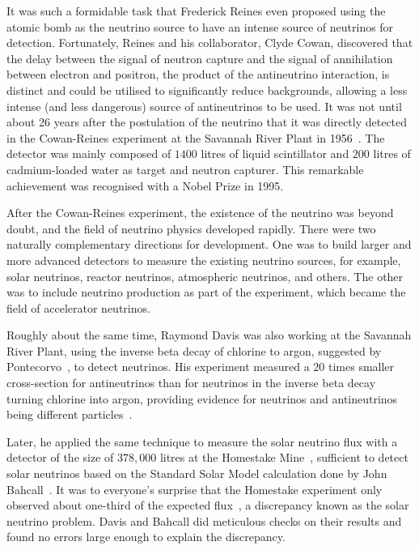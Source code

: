 It was such a formidable task that Frederick Reines even proposed using the atomic bomb as the neutrino source to have an intense source of neutrinos for detection.
Fortunately, Reines and his collaborator, Clyde Cowan, discovered that the delay between the signal of neutron capture and the signal of annihilation between electron and positron, the product of the antineutrino interaction, is distinct and could be utilised to significantly reduce backgrounds, allowing a less intense (and less dangerous) source of antineutrinos to be used.
It was not until about 26 years after the postulation of the neutrino that it was directly detected in the Cowan-Reines experiment at the Savannah River Plant in 1956~\cite{Cowan:1956rrn}. 
The detector was mainly composed of $1400$ litres of liquid scintillator and $200$ litres of cadmium-loaded water as target and neutron capturer.
This remarkable achievement was recognised with a Nobel Prize in 1995.

After the Cowan-Reines experiment, the existence of the neutrino was beyond doubt, and the field of neutrino physics developed rapidly. 
There were two naturally complementary directions for development.
One was to build larger and more advanced detectors to measure the existing neutrino sources, for example, solar neutrinos, reactor neutrinos, atmospheric neutrinos, and others.
The other was to include neutrino production as part of the experiment, which became the field of accelerator neutrinos.

Roughly about the same time, Raymond Davis was also working at the Savannah River Plant, using the inverse beta decay of chlorine to argon, suggested by Pontecorvo~\cite{Pontecorvo:1946mv}, to detect neutrinos.
His experiment measured a $20$ times smaller cross-section for antineutrinos than for neutrinos in the inverse beta decay turning chlorine into argon, providing evidence for neutrinos and antineutrinos being different particles~\cite{Davis:1959pba}.

Later, he applied the same technique to measure the solar neutrino flux with a detector of the size of $378,000$ litres at the Homestake Mine~\cite{Davis:1964zz}, sufficient to detect solar neutrinos based on the Standard Solar Model calculation done by John Bahcall~\cite{Bahcall:1964ya}.
It was to everyone's surprise that the Homestake experiment only observed about one-third of the expected flux~\cite{Davis:1968}, a discrepancy known as the solar neutrino problem.
Davis and Bahcall did meticulous checks on their results and found no errors large enough to explain the discrepancy.

